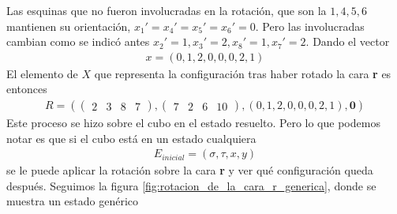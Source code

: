 \documentclass{article}
\theoremstyle{definition}
\renewcommand{\r}{\textbf{r}}
\begin{document}
Las esquinas que no fueron involucradas en la rotación, que son la $1,4,5,6$ mantienen su orientación, $x_1'=x_4'=x_5'=x_6'=0$. Pero las involucradas cambian como se indicó antes $x_2'=1,x_3'=2,x_8'=1,x_7'=2$. Dando el vector
\begin{align*}
    x=(0,1,2,0,0,0,2,1)
\end{align*}
El elemento de $X$ que representa la configuración tras haber rotado la cara \r{} es entonces
\begin{align*}
    R=\left(\begin{pmatrix}
                2 & 3 & 8 & 7
            \end{pmatrix},\begin{pmatrix}
                              7 & 2 & 6 & 10
                          \end{pmatrix},(0,1,2,0,0,0,2,1),\mathbf{0}\right)
\end{align*}
Este proceso se hizo sobre el cubo en el estado resuelto. Pero lo que podemos notar es que si el cubo está en un estado cualquiera
\begin{align*}
    E_{inicial}=(\sigma,\tau,x,y)
\end{align*}
se le puede aplicar la rotación sobre la cara \r{} y ver qué configuración queda después. Seguimos la figura \ref{fig:rotacion_de_la_cara_r_generica}, donde se muestra un estado genérico
\end{document}

